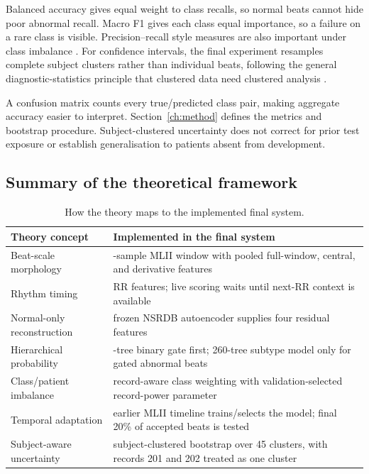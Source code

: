 Balanced accuracy gives equal weight to class recalls, so normal beats cannot
hide poor abnormal recall. Macro F1 gives each class equal importance, so a
failure on a rare class is visible. Precision--recall style measures are also
important under class imbalance \cite{saito2015pr}. For confidence intervals,
the final experiment resamples complete subject clusters rather than individual
beats, following the general diagnostic-statistics principle that clustered
data need clustered analysis \cite{rutter2000clustered}.

A confusion matrix counts every true/predicted class pair, making aggregate
accuracy easier to interpret. Section~\ref{ch:method} defines the metrics and
bootstrap procedure. Subject-clustered uncertainty does not correct for prior
test exposure or establish generalisation to patients absent from development.

\subsection{Summary of the theoretical framework}

\begin{table}[H]
\centering
\caption{How the theory maps to the implemented final system.}
\label{tab:theory-system-alignment}
\begin{tabular}{>{\raggedright\arraybackslash}p{4.2cm}>{\raggedright\arraybackslash}p{9.0cm}}
\toprule
Theory concept & Implemented in the final system\\
\midrule
Beat-scale morphology & 512-sample MLII window with pooled full-window,
central, and derivative features\\
Rhythm timing & 15 RR features; live scoring waits until next-RR context is
available\\
Normal-only reconstruction & frozen NSRDB autoencoder supplies four residual
features\\
Hierarchical probability & 240-tree binary gate first; 260-tree subtype model
only for gated abnormal beats\\
Class/patient imbalance & record-aware class weighting with validation-selected
record-power parameter\\
Temporal adaptation & earlier MLII timeline trains/selects the model; final
20\% of accepted beats is tested\\
Subject-aware uncertainty & subject-clustered bootstrap over 45 clusters, with
records 201 and 202 treated as one cluster\\
\bottomrule
\end{tabular}
\end{table}
